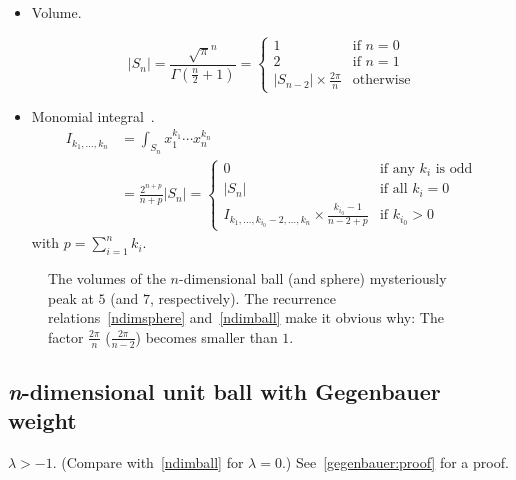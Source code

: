 \documentclass[final]{scrartcl}
\begin{document}
\begin{itemize}
  \item Volume.

\begin{equation}\label{ndimball}
  |S_n|
  = \frac{\sqrt{\pi}^n}{\Gamma(\frac{n}{2}+1)}
  = \begin{cases}
     1&\text{if $n = 0$}\\
     2&\text{if $n = 1$}\\
     |S_{n-2}| \times \frac{2\pi}{n}&\text{otherwise}
  \end{cases}
\end{equation}

\item Monomial integral~\cite{folland}.
\begin{align}\nonumber
  I_{k_1,\dots,k_n}
  &= \int_{S_n} x_1^{k_1}\cdots x_n^{k_n}\\
  &= \frac{2^{n + p}}{n + p} |S_n|
  =\begin{cases}
    0&\text{if any $k_i$ is odd}\\
    |S_n|&\text{if all $k_i=0$}\\
    I_{k_1,\dots,k_{i_0}-2,\dots,k_n} \times \frac{k_{i_0} - 1}{n - 2 + p}&\text{if $k_{i_0} > 0$}
  \end{cases}
\end{align}
with $p=\sum_{i=1}^n k_i$.
\end{itemize}

\begin{figure}
\centering

  \caption{The volumes of the $n$-dimensional ball (and sphere) mysteriously peak at $5$
  (and $7$, respectively). The recurrence relations~\eqref{ndimsphere}
  and~\eqref{ndimball} make it obvious why: The factor $\frac{2\pi}{n}$
  ($\frac{2\pi}{n-2}$) becomes smaller than $1$.}
\end{figure}

\subsection*{\textit{n}-dimensional unit ball with Gegenbauer weight}
  $\lambda > -1$. (Compare with~\eqref{ndimball} for $\lambda = 0$.)
  See~\ref{gegenbauer:proof} for a proof.
\end{document}
